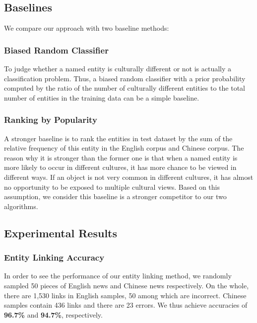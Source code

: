 \subsection{Baselines}
We compare our approach with two baseline methods:

\subsubsection{Biased Random Classifier}
To judge whether a named entity is culturally different or not is
actually a classification problem.
Thus, a biased random classifier with a prior probability computed by
the ratio of the number of culturally different entities to
the total number of entities in the training data can be
a simple baseline.

\subsubsection{Ranking by Popularity}
A stronger baseline is to rank the entities in test dataset by the sum of the relative frequency of
this entity in the English corpus and Chinese corpus.
The reason why it is stronger than the former one is that when a named entity is more likely to occur in different cultures, it has more chance to be viewed in different ways.
If an object is not very common in different cultures, it has almost no opportunity to be
exposed to multiple cultural views.
Based on this assumption, we consider this baseline is a stronger competitor to our two algorithms.


\subsection{Experimental Results}


\subsubsection{Entity Linking Accuracy}

In order to see the performance of our entity linking method, we randomly sampled 50 pieces of English news and Chinese news respectively.
On the whole, there are 1,530 links in English samples, 50 among which are incorrect. Chinese samples contain 436 links and there are
23 errors. We thus achieve accuracies of \textbf{96.7\%} and \textbf{94.7\%},
respectively.

